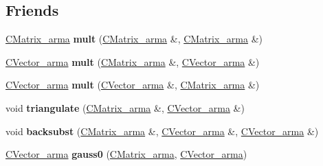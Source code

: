 \subsection*{Friends}
\begin{DoxyCompactItemize}
\item 
\mbox{\label{class_c_matrix__arma_a8422dc7a72a06eb1f953e9affd2f9d64}} 
\hyperlink{class_c_matrix__arma}{C\+Matrix\+\_\+arma} {\bfseries mult} (\hyperlink{class_c_matrix__arma}{C\+Matrix\+\_\+arma} \&, \hyperlink{class_c_matrix__arma}{C\+Matrix\+\_\+arma} \&)
\item 
\mbox{\label{class_c_matrix__arma_a305145ed021699fbc20fca4b4eeb256a}} 
\hyperlink{class_c_vector__arma}{C\+Vector\+\_\+arma} {\bfseries mult} (\hyperlink{class_c_matrix__arma}{C\+Matrix\+\_\+arma} \&, \hyperlink{class_c_vector__arma}{C\+Vector\+\_\+arma} \&)
\item 
\mbox{\label{class_c_matrix__arma_a1cfe5603d974a4177fb8551e1a25c4dc}} 
\hyperlink{class_c_vector__arma}{C\+Vector\+\_\+arma} {\bfseries mult} (\hyperlink{class_c_vector__arma}{C\+Vector\+\_\+arma} \&, \hyperlink{class_c_matrix__arma}{C\+Matrix\+\_\+arma} \&)
\item 
\mbox{\label{class_c_matrix__arma_aa6602cb9aadd3f6e21e59970e48910f9}} 
void {\bfseries triangulate} (\hyperlink{class_c_matrix__arma}{C\+Matrix\+\_\+arma} \&, \hyperlink{class_c_vector__arma}{C\+Vector\+\_\+arma} \&)
\item 
\mbox{\label{class_c_matrix__arma_a7bf42965f7d5bc4578efb74b4b073921}} 
void {\bfseries backsubst} (\hyperlink{class_c_matrix__arma}{C\+Matrix\+\_\+arma} \&, \hyperlink{class_c_vector__arma}{C\+Vector\+\_\+arma} \&, \hyperlink{class_c_vector__arma}{C\+Vector\+\_\+arma} \&)
\item 
\mbox{\label{class_c_matrix__arma_ae166a92326555273e379007594580b7a}} 
\hyperlink{class_c_vector__arma}{C\+Vector\+\_\+arma} {\bfseries gauss0} (\hyperlink{class_c_matrix__arma}{C\+Matrix\+\_\+arma}, \hyperlink{class_c_vector__arma}{C\+Vector\+\_\+arma})
\item 
\mbox{\label{class_c_matrix__arma_a047078638c03f579c9e65259dd3571f4}} 

\end{DoxyCompactItemize}
